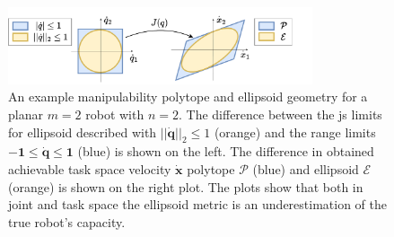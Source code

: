 \begin{figure}
    \centering
    \includegraphics[width=0.8\textwidth]{Chapters/imgs/ellip_poly.pdf}
    \caption{An example manipulability polytope and ellipsoid geometry for a planar $m=2$ robot with $n=2$. The difference between the \gls{js} limits for ellipsoid described with $||\dot{\bm{q}}||_2\leq1$ (orange) and the range limits $\bm{-1}\leq\dot{\bm{q}}\leq\bm{1}$ (blue) is shown on the left. The difference in obtained achievable task space velocity $\dot{\bm{x}}$ polytope $\mathcal{P}$ (blue) and ellipsoid $\mathcal{E}$ (orange) is shown on the right plot. The plots show that both in joint and task space the ellipsoid metric is an underestimation of the true robot's capacity.}
    \label{fig:ellip_poly_dif}
\end{figure}


